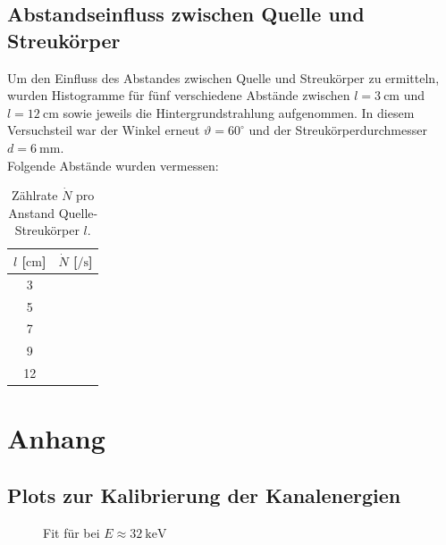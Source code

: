 \documentclass[draft, slug=CS, room=Andreas-Schubert-Bau\,\ Labor\ 406,
supervisor=Juliane\ Volkmer, coursedate=29.\ 11.\ 2019]{../../Lab_Report_LaTeX/lab_report}
\newcommand{\kev}[1]{\SI{#1}{\kilo\electronvolt}}
\begin{document}
\subsection{Abstandseinfluss zwischen Quelle und Streukörper}
\label{sec:abstand}

Um den Einfluss des Abstandes zwischen Quelle und Streukörper zu ermitteln, wurden Histogramme
für fünf verschiedene Abstände zwischen \(l = \SI{3}{\centi\metre}\) und
\(l = \SI{12}{\centi\metre}\) sowie jeweils die Hintergrundstrahlung aufgenommen.
In diesem Versuchsteil war der Winkel erneut \(\vartheta = 60^\circ\) und der
Streukörperdurchmesser \(d = \SI{6}{\milli\metre}\).\\

Folgende Abstände wurden vermessen:
\begin{table}[H]
        \centering
        \begin{tabular}{S|S}
                \toprule
                {\(l\) [\(\si{\centi\metre}\)]} & {\(\dot{N}\) [\(\si{\per\second}\)]} \\
                                               &                                      \\
                5                               &                                      \\
                7                               &                                      \\
                9                               &                                      \\
                12                              &
        \end{tabular}
        \caption{Zählrate \(\dot{N}\) pro Anstand Quelle-Streukörper \(l\).}
        \label{tab:abstand}
\end{table}


\section{Anhang}
\label{sec:anshang}

\subsection{Plots zur Kalibrierung der Kanalenergien}
\label{sec:ancalplot}

\begin{figure}[H]\centering
  
  \caption{Fit f\"ur  bei \(E \approx \kev{32}\)}
\end{figure}
\end{document}
